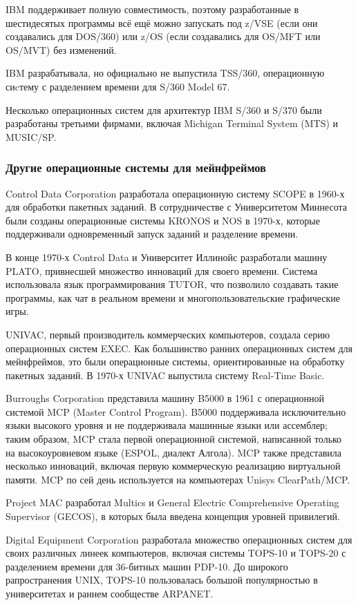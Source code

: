 IBM поддерживает полную совместимость, поэтому разработанные в шестидесятых программы всё ещё можно запускать под z/VSE (если они создавались для DOS/360) или z/OS (если создавались для OS/MFT или OS/MVT) без изменений.

IBM разрабатывала, но официально не выпустила TSS/360, операционную сиcтему с разделением времени для S/360 Model 67.

Несколько операционных систем для архитектур IBM S/360 и S/370 были разработаны третьими фирмами, включая Michigan Terminal System (MTS) и MUSIC/SP.

\subsubsection{Другие операционные системы для мейнфреймов}\label{base:os:history:other}
Control Data Corporation разработала операционную систему SCOPE в 1960-х для обработки пакетных заданий. В сотрудничестве с Университетом Миннесота были созданы операционные системы KRONOS и NOS в 1970-х, которые поддерживали одновременный запуск заданий и разделение времени.

В конце 1970-х Control Data и Университет Иллинойс разработали машину PLATO, привнесшей множество инноваций для своего времени. Система использовала язык программирования TUTOR, что позволило создавать такие программы, как чат в реальном времени и многопользовательские графические игры.

UNIVAC, первый производитель коммерческих компьютеров, создала серию операционных систем EXEC. Как большинство ранних операционных систем для мейнфреймов, это были операционные системы, ориентированные на обработку пакетных заданий. В 1970-х UNIVAC выпустила систему Real-Time Basic.

Burroughs Corporation представила машину B5000 в 1961 с операционной системой MCP (Master Control Program). B5000 поддерживала исключительно языки высокого уровня и не поддерживала машинные языки или ассемблер; таким образом, MCP стала первой операционной системой, написанной только на высокоуровневом языке (ESPOL, диалект Алгола). MCP также представила несколько инноваций, включая первую коммерческую реализацию виртуальной памяти. MCP по сей день используется на компьютерах Unisys ClearPath/MCP.

Project MAC разработал Multics и General Electric Comprehensive Operating Supervisor (GECOS), в которых была введена концепция уровней привилегий.

Digital Equipment Corporation разработала множество операционных систем для своих различных линеек компьютеров, включая системы TOPS-10 и TOPS-20 с разделением времени для 36-битных машин PDP-10. До широкого рапространения UNIX, TOPS-10 пользовалась большой популярностью в университетах и раннем сообществе ARPANET.

